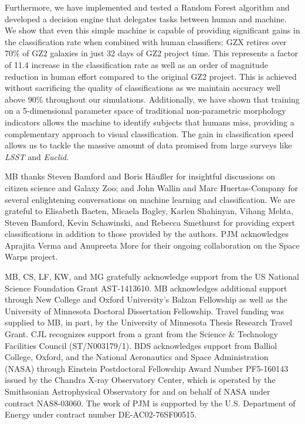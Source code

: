 \documentclass[twocolumn,  trackchanges,]{aastex6}%
\begin{document}
Furthermore, we have implemented and tested a Random Forest algorithm 
and developed a decision engine that delegates tasks between human and 
machine.  We show that even this simple machine is capable of providing significant 
gains in the classification rate when combined with human classifiers: GZX
 retires over 70\% of GZ2 galaxies in just 32 days of GZ2 project time.  
This represents a factor of 11.4 increase in the classification rate as well as
 an order of magnitude reduction in human effort compared to the original GZ2 project. 
This is achieved without sacrificing the quality of classifications as we maintain 
accuracy well above 90\% throughout our simulations. 
Additionally, we have shown that training on a 5-dimensional parameter space of 
traditional non-parametric morphology indicators allows the machine to identify 
subjects that humans miss, providing  a complementary approach to visual classification. 
The gain in classification speed allows us to tackle the massive amount of data promised
 from large surveys like \textit{LSST} and \textit{Euclid}.


\acknowledgements
MB thanks Steven Bamford and Boris H{\"a}u{\ss}ler for insightful discussions on citizen science and Galaxy Zoo; and John Wallin and Marc Huertas-Company for several enlightening conversations on machine learning and classification. 
We are grateful to Elisabeth Baeten, Micaela Bagley, Karlen Shahinyan, Vihang Mehta, Steven Bamford, Kevin Schawinski, and Rebecca Smethurst for providing expert classifications in addition to those provided by the authors. PJM acknowledges Aprajita Verma and Anupreeta More for their ongoing collaboration on the Space Warps project. 

MB, CS, LF, KW, and MG gratefully acknowledge support from the US National Science
Foundation Grant AST-1413610.  MB acknowledges additional support 
through New College and Oxford University's Balzan Fellowship as well as the University
of Minnesota Doctoral Dissertation Fellowship. Travel funding was supplied 
to MB, in part, by the University of Minnesota Thesis Research Travel Grant. CJL recognizes support from a grant from the Science \& Technology Facilities Council (ST/N003179/1). 
BDS acknowledges support from Balliol College, Oxford, and the National Aeronautics and Space Administration (NASA) through Einstein Postdoctoral Fellowship Award Number PF5-160143 issued by the Chandra X-ray Observatory Center, which is operated by the Smithsonian Astrophysical Observatory for and on behalf of NASA under contract NAS8-03060. The work of PJM is supported by the U.S. Department of Energy under contract number DE-AC02-76SF00515.
\end{document}
